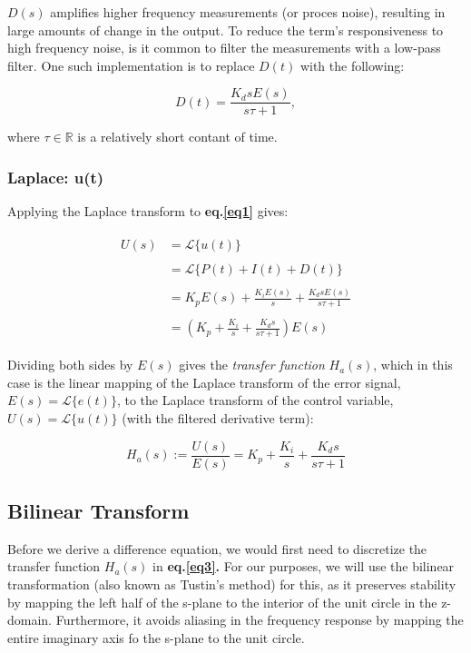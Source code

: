 \documentclass[11pt]{article}
\newcommand{\R}{\mathbb{R}}
\theoremstyle{definition}
\begin{document}
$D(s)$ amplifies higher frequency measurements (or proces noise), resulting in large amounts of change in the output. To reduce the term's responsiveness to
high frequency noise, is it common to filter the measurements with a low-pass filter. One such implementation is to replace $D(t)$ with the following:

\[ D(t) = \frac{K_{d}sE(s)}{s\tau + 1},\] 

where $\tau \in \R$ is a relatively short contant of time.

\subsubsection{Laplace: u(t)}

Applying the Laplace transform to \textbf{eq.\ref{eq1}} gives:

\begin{align*}
\begin{split}
    U(s) &= \mathcal{L}\{u(t)\} \\\\
         &= \mathcal{L}\{P(t) + I(t) + D(t)\} \\\\
         &= K_{p}E(s) + \frac{K_{i}E(s)}{s} + \frac{K_{d}sE(s)}{s\tau + 1}\\\\
         &= \left(K_{p} + \frac{K_{i}}{s} + \frac{K_{d}s}{s\tau + 1}\right)E(s)
\end{split}
\end{align*}

Dividing both sides by $E(s)$ gives the \textit{transfer function} $H_{a}(s)$, which in this case is the linear mapping of the Laplace transform of
the error signal, $E(s) = \mathcal{L}\{e(t)\}$, to the Laplace transform of the control variable, $U(s) = \mathcal{L}\{u(t)\}$ (with the filtered
derivative term):

\begin{equation} \label{eq3}
    \boxed{
        H_{a}(s) := \frac{U(s)}{E(s)} = K_{p} + \frac{K_{i}}{s} + \frac{K_{d}s}{s\tau + 1} 
    }
\end{equation}

\subsection{Bilinear Transform}

Before we derive a difference equation, we would first need to discretize the transfer function $H_{a}(s)$ in \textbf{eq.\ref{eq3}.} For our purposes, we will use
the bilinear transformation (also known as Tustin's method) for this, as it preserves stability by mapping the left half of the s-plane to the interior
of the unit circle in the z-domain. Furthermore, it avoids aliasing in the frequency response by mapping the entire imaginary axis fo the s-plane to the
unit circle.
\end{document}
